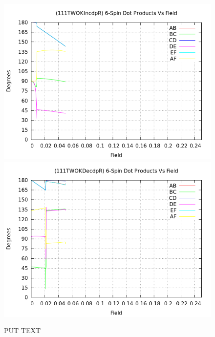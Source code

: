 \documentclass{article}
\begin{document}
\begin{figure}
\centering
\includegraphics[scale=0.5]{HVariedData/Pictures/111TWOKIncdpR.png}
\includegraphics[scale=0.5]{HVariedData/Pictures/111TWOKDecdpR.png}
\caption{PUT TEXT}
\end{figure}
\end{document}
